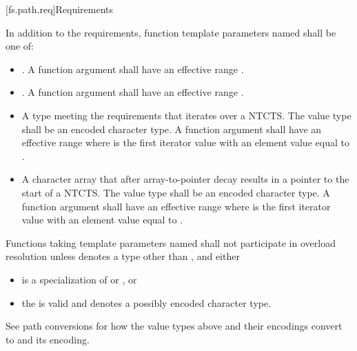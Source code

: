 [fs.path.req]{Requirements}

\pnum
In addition to the requirements,
function template parameters named 
shall be one of:
\begin{itemize}
\item {}. A function
  argument   shall have an
  effective range .
\item {}. A function
  argument   shall have an
  effective range .
\item A type meeting the  requirements that iterates over a NTCTS\@.
  The value type shall be an encoded character type. A function argument
    shall have an effective range
   where  is the first
  iterator value with an element value equal to
  .
\item A character array that after array-to-pointer decay results in a
  pointer to the start of a NTCTS\@. The value type shall be an encoded character type. A
  function argument   shall
  have an effective range  where
   is the first iterator value with an element value equal to
  .
\end{itemize}

\pnum
Functions taking template parameters named 
shall not participate in overload resolution unless
 denotes a type other than , and
either
\begin{itemize}
\item
{} is a specialization of
 or , or
\item
the   is valid and
denotes a possibly  encoded character type.
\end{itemize}

\pnum
\begin{note}
See path conversions
for how the value types above and their encodings convert to
 and its encoding.
\end{note}

